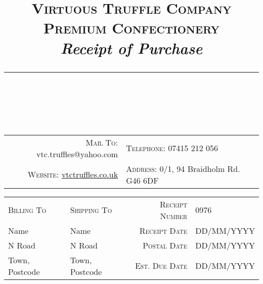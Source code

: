 \documentclass[11pt, english]{article}
\newcommand{\HRule}[1]{\rule{\linewidth}{#1}}
\begin{document}

        \title{
                \huge{\textsc{Virtuous Truffle Company}}\\
                \large{\textsc{Premium Confectionery}}\\
		\large{\textit{Receipt of Purchase}}
                \HRule{0.5pt}\\ [-1.75cm]
                }
        \author{}
	\date{}
        \maketitle

	\begin{center}
	        \scriptsize
	\begin{tabular}{r|l}
	        \textsc{Mail To:} vtc.truffles@yahoo.com & \textsc{Telephone:} 07415 212 056\\
	        \textsc{Website:} \href{http://vtctruffles.co.uk}{vtctruffles.co.uk} & \textsc{Address:} 0/1, 94 Braidholm Rd. G46 6DF\\
	\end{tabular}
	\end{center}

	\vspace{0.25cm}

	\begin{table}[h]
		\footnotesize
		\renewcommand{\arraystretch}{1.25}
	\begin{center}
	\begin{tabular}{p{4cm}p{4cm}|rl}
		\textsc{Billing To} & \textsc{Shipping To} & \textsc{Receipt Number} & 0976\\
		\cline{1-2}
		Name & Name & \textsc{Receipt Date} & DD/MM/YYYY\\
		N Road & N Road & \textsc{Postal Date} & DD/MM/YYYY\\
		Town, Postcode & Town, Postcode & \textsc{Est. Due Date} & DD/MM/YYYY\\
	\end{tabular}
	\end{center}
	\end{table}
\end{document}
